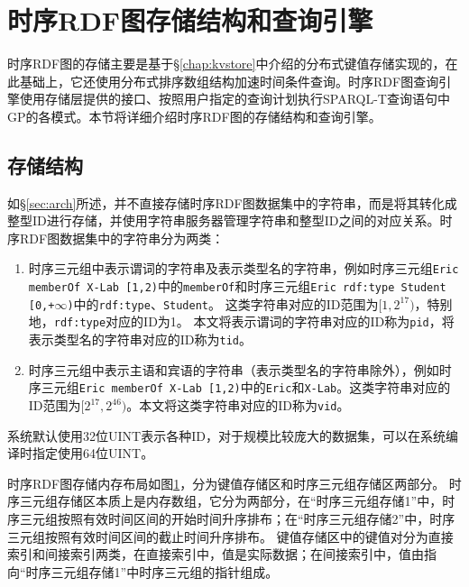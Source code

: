 \section{时序RDF图存储结构和查询引擎}
时序RDF图的存储主要是基于\S\ref{chap:kvstore}中介绍的分布式键值存储实现的，在此基础上，它还使用分布式排序数组结构加速时间条件查询。时序RDF图查询引擎使用存储层提供的接口、按照用户指定的查询计划执行SPARQL-T查询语句中GP的各模式。本节将详细介绍时序RDF图的存储结构和查询引擎。
\subsection{存储结构}
\label{sec:rdfstore}
如\S\ref{sec:arch}所述，\sys 并不直接存储时序RDF图数据集中的字符串，而是将其转化成整型ID进行存储，并使用字符串服务器管理字符串和整型ID之间的对应关系。时序RDF图数据集中的字符串分为两类：
\begin{enumerate}
\item 时序三元组中表示谓词的字符串及表示类型名的字符串，例如时序三元组\texttt{Eric memberOf X-Lab [1,2)}中的\texttt{memberOf}和时序三元组\texttt{Eric rdf:type Student [0,+$\infty$)}中的\texttt{rdf:type}、\texttt{Student}。
这类字符串对应的ID范围为$[1,2^{17})$，特别地，\texttt{rdf:type}对应的ID为1。
本文将表示谓词的字符串对应的ID称为\texttt{pid}，将表示类型名的字符串对应的ID称为\texttt{tid}。
\item 时序三元组中表示主语和宾语的字符串（表示类型名的字符串除外），例如时序三元组\texttt{Eric memberOf X-Lab [1,2)}中的\texttt{Eric}和\texttt{X-Lab}。这类字符串对应的ID范围为$[2^{17},2^{46})$。本文将这类字符串对应的ID称为\texttt{vid}。
\end{enumerate}

系统默认使用32位UINT表示各种ID，对于规模比较庞大的数据集，可以在系统编译时指定使用64位UINT。

时序RDF图存储内存布局如图\ref{trdfstore}，分为键值存储区和时序三元组存储区两部分。
时序三元组存储区本质上是内存数组，它分为两部分，在“时序三元组存储1”中，时序三元组按照有效时间区间的开始时间升序排布；在“时序三元组存储2”中，时序三元组按照有效时间区间的截止时间升序排布。
键值存储区中的键值对分为直接索引和间接索引两类，在直接索引中，值是实际数据；在间接索引中，值由指向“时序三元组存储1”中时序三元组的指针组成。

\begin{figure}[!htb]
\label{trdfstore}
\end{figure}

